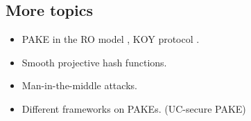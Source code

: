 \documentclass[11pt]{article}
\begin{document}
 
\subsection{More topics}
\begin{itemize}
\item PAKE in the RO model \cite{DBLP:conf/eurocrypt/BellarePR00}, KOY protocol \cite{DBLP:journals/jacm/KatzOY09}.
\item Smooth projective hash functions.
\item Man-in-the-middle attacks.
\item Different frameworks on PAKEs. (UC-secure PAKE)
\end{itemize}



\end{document}
